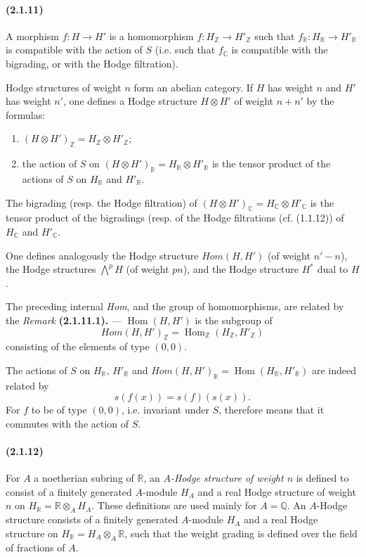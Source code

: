 \documentclass[10pt]{article}
\newcommand{\C}{\mathbb C}
\newcommand{\Q}{\mathbb Q}
\newcommand{\Z}{\mathbb Z}
\newcommand{\Hom}{\operatorname{Hom}}
\newcommand{\fg}{\guillemotright}
\newcommand{\og}{\guillemotleft}
\newcommand{\R}{\mathbb R}
\begin{document}
\paragraph{(2.1.11)} A morphism $f:H\to H'$ is a homomorphism $f:H_\Z\to H'_\Z$ such that $f_\R:H_\R\to H'_\R$ is compatible with the action of $S$ (i.e. such that $f_\C$ is compatible with the bigrading, or with the Hodge filtration).

Hodge structures of weight $n$ form an abelian category. If $H$ has weight $n$ and $H'$ has weight $n'$, one defines a Hodge structure $H\otimes H'$ of weight $n+n'$ by the formulas:
\begin{enumerate}[label=\alph*)]
\item $(H\otimes H')_\Z=H_\Z\otimes H'_\Z$;
\item the action of $S$ on $(H\otimes H')_\R=H_\R\otimes H'_\R$ is the tensor product of the actions of $S$ on $H_\R$ and $H'_\R$.
\end{enumerate}
The bigrading (resp. the Hodge filtration) of $(H\otimes H')_\C=H_\C\otimes H'_\C$ is the tensor product of the bigradings (resp. of the Hodge filtrations (cf. (1.1.12)) of $H_\C$ and $H'_\C$.

One defines analogously the Hodge structure $\mathit{Hom}(H,H')$ (of weight $n'-n$), the Hodge structures $\bigwedge^p H$ (of weight $pn$), and the Hodge structure $H^*$ dual to $H$.

The preceding \og internal \emph{Hom}\fg{}, and the group of homomorphisms, are related by the \emph{Remark} \textbf{(2.1.11.1).} --- $\Hom(H,H')$ is the subgroup of
\[
\mathit{Hom}(H,H')_\Z=\Hom_\Z(H_\Z,H'_\Z)
\]
consisting of the elements of type $(0,0)$.

The actions of $S$ on $H_\R$, $H'_\R$ and $\mathit{Hom}(H,H')_\R=\Hom(H_\R,H'_\R)$ are indeed related by
\[
s(f(x))=s(f)(s(x)).
\]
For $f$ to be of type $(0,0)$, i.e. invariant under $S$, therefore means that it commutes with the action of $S$.

\paragraph{(2.1.12)} For $A$ a noetherian subring of $\R$, an \emph{$A$-Hodge structure of weight $n$} is defined to consist of a finitely generated $A$-module $H_A$ and a real Hodge structure of weight $n$ on $H_\R=\R\otimes_AH_A$. These definitions are used mainly for $A=\Q$. An $A$-Hodge structure consists of a finitely generated $A$-module $H_A$ and a real Hodge structure on $H_\R=H_A\otimes_A\R$, such that the weight grading is defined over the field of fractions of $A$.
\end{document}
